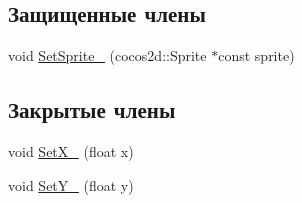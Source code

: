 \subsection*{Защищенные члены}
\begin{DoxyCompactItemize}
\item 
void \hyperlink{classrtm_1_1_coating_object_a1d0227cd023ce6e6bd475194b5cbfe2d}{Set\+Sprite\+\_\+} (cocos2d\+::\+Sprite $\ast$const sprite)
\end{DoxyCompactItemize}
\subsection*{Закрытые члены}
\begin{DoxyCompactItemize}
\item 
void \hyperlink{classrtm_1_1_coating_object_a5bb5e11400d05dc2d50bfbd2021d3aac}{Set\+X\+\_\+} (float x)
\item 
void \hyperlink{classrtm_1_1_coating_object_a3f67f750f8bf4b87a55655018c0c8d71}{Set\+Y\+\_\+} (float y)
\end{DoxyCompactItemize}
